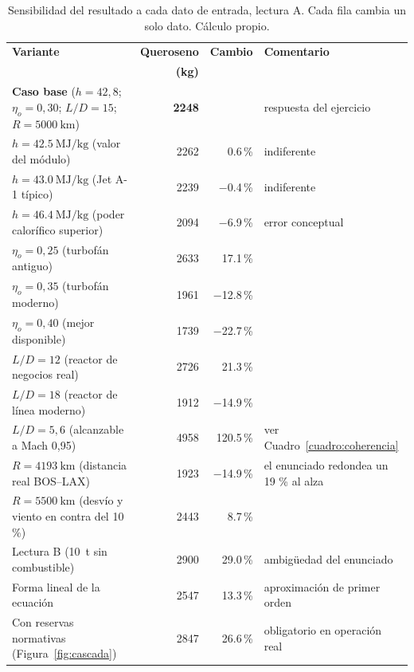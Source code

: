\documentclass[11pt,letterpaper]{article}
\begin{document}
\begin{table}[htbp]
\small
\caption{Sensibilidad del resultado a cada dato de entrada, lectura A. Cada
fila cambia un solo dato. Cálculo propio.}
\label{cuadro:sensibilidad}
\begin{tabularx}{\textwidth}{@{}Xrrl@{}}
\toprule
\textbf{Variante} & \textbf{Queroseno} & \textbf{Cambio} &
\textbf{Comentario} \\
 & \textbf{(\si{\kilogram})} & & \\
\midrule
\textbf{Caso base} (\(h=42{,}8\); \(\eta_o=0{,}30\); \(L/D=15\);
  \(R=\SI{5000}{\kilo\meter}\))
  & \textbf{\num{2248}} & & respuesta del ejercicio \\
\midrule
\(h = \SI{42.5}{\mega\joule\per\kilogram}\) (valor del módulo)
  & \num{2262} & \num[retain-explicit-plus]{+0.6}\,\% & indiferente \\
\(h = \SI{43.0}{\mega\joule\per\kilogram}\) (Jet A-1 típico)
  & \num{2239} & \num{-0.4}\,\% & indiferente \\
\(h = \SI{46.4}{\mega\joule\per\kilogram}\) (poder calorífico superior)
  & \num{2094} & \num{-6.9}\,\% & \textcolor{cAviso}{error conceptual} \\
\midrule
\(\eta_o = 0{,}25\) (turbofán antiguo)
  & \num{2633} & \num[retain-explicit-plus]{+17.1}\,\% & \\
\(\eta_o = 0{,}35\) (turbofán moderno)
  & \num{1961} & \num{-12.8}\,\% & \\
\(\eta_o = 0{,}40\) (mejor disponible)
  & \num{1739} & \num{-22.7}\,\% & \\
\midrule
\(L/D = 12\) (reactor de negocios real)
  & \num{2726} & \num[retain-explicit-plus]{+21.3}\,\% & \\
\(L/D = 18\) (reactor de línea moderno)
  & \num{1912} & \num{-14.9}\,\% & \\
\(L/D = 5{,}6\) (alcanzable a Mach 0,95)
  & \num{4958} & \num[retain-explicit-plus]{+120.5}\,\% &
  \textcolor{cAviso}{ver Cuadro~\ref{cuadro:coherencia}} \\
\midrule
\(R = \SI{4193}{\kilo\meter}\) (distancia real BOS--LAX)
  & \num{1923} & \num{-14.9}\,\% &
  \textcolor{cAviso}{el enunciado redondea un 19 \% al alza} \\
\(R = \SI{5500}{\kilo\meter}\) (desvío y viento en contra del 10 \%)
  & \num{2443} & \num[retain-explicit-plus]{+8.7}\,\% & \\
\midrule
Lectura B (\SI{10}{\tonne} sin combustible)
  & \num{2900} & \num[retain-explicit-plus]{+29.0}\,\% & ambigüedad del
  enunciado \\
Forma lineal de la ecuación
  & \num{2547} & \num[retain-explicit-plus]{+13.3}\,\% & aproximación de primer
  orden \\
Con reservas normativas (Figura~\ref{fig:cascada})
  & \num{2847} & \num[retain-explicit-plus]{+26.6}\,\% & obligatorio en
  operación real \\
\bottomrule
\end{tabularx}
\end{table}
\end{document}
